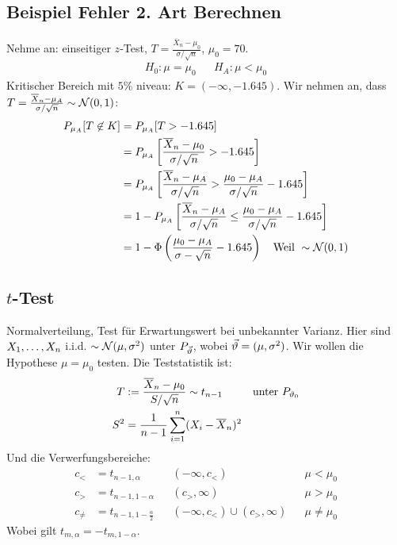 \subsection*{Beispiel Fehler 2. Art Berechnen}
Nehme an: einseitiger $z$-Test, $T = \frac{\overline{X}_n - \mu_0}{\sigma /
    \sqrt{n}}$, $\mu_0 = 70$.
\begin{align*}
  H_0 : \mu = \mu_0 &  & H_A : \mu < \mu_0
\end{align*}
Kritischer Bereich mit $5$\% niveau: $K =  (- \infty, -1.645)$. Wir
nehmen an, dass $T = \frac{\overline{X}_n - \mu_A}{\sigma / \sqrt{n}} \sim \mathcal{N} (0, 1)$:
\begin{align*}
  P_{\mu_A}[T \not \in K]
   & = P_{\mu_A}[T > -1.645]                                                                                                            \\
   & = P_{\mu_A} \left[\frac{\overline{X}_n - \mu_0}{\sigma / \sqrt{n}} > -1.645 \right]                                                \\
   & = P_{\mu_A} \left[\frac{\overline{X}_n - \mu_A}{\sigma / \sqrt{n}} > \frac{\mu_0 - \mu_A}{\sigma / \sqrt{n}} -1.645 \right]        \\
   & = 1 - P_{\mu_A} \left[\frac{\overline{X}_n - \mu_A}{\sigma / \sqrt{n}} \leq \frac{\mu_0 - \mu_A}{\sigma / \sqrt{n}} -1.645 \right] \\
   & = 1 - \Phi \left( \frac{\mu_0 - \mu_A}{\sigma - \sqrt{n}} - 1.645 \right)       \quad \text{Weil } \sim \mathcal{N} (0, 1)
\end{align*}
\subsection*{$t$-Test}
Normalverteilung, Test für Erwartungswert bei unbekannter Varianz. Hier sind
$X_1, \dots, X_n$ i.i.d. $\sim \mathcal{N} (\mu, \sigma^2)$ unter $P_{\vec{\vartheta}}$, wobei
$\vec{\vartheta} = (\mu, \sigma^2)$. Wir wollen die Hypothese $\mu = \mu_0$ testen.
Die Teststatistik ist:
\begin{align*}
  T   & := \frac{\overline{X}_n - \mu_0}{S / \sqrt{n}} \sim t_{n-1}
      &                                                             & \text{unter } P_{\vartheta_0} \\
  S^2 & = \frac{1}{n-1} \sum_{i = 1}^n  (X_i - \overline{X}_n)^2
\end{align*}
Und die Verwerfungsbereiche:
\begin{align*}
  c_<      & = t_{n-1, \alpha}               &  & (-\infty, c_<)                     &  & \mu < \mu_0    \\
  c_>      & = t_{n-1, 1 - \alpha}           &  & (c_>, \infty)                      &  & \mu > \mu_0    \\
  c_{\neq} & = t_{n-1, 1 - \frac{\alpha}{2}} &  & (-\infty, c_<) \cup  (c_>, \infty) &  & \mu \neq \mu_0
\end{align*}
Wobei gilt $t_{m, \alpha} = -t_{m, 1 - \alpha}$.
